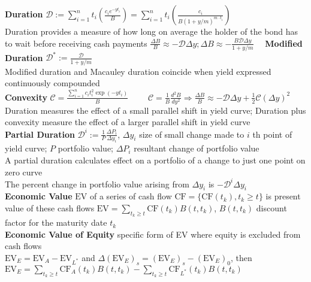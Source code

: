 \documentclass[12pt,landscape, a4paper]{article}
\theoremstyle{remark}
\newcommand{\EV}{\mathrm{EV}}
\newcommand{\CF}{\mathrm{CF}}
\begin{document}
\setlength{\abovedisplayskip}{0pt}%
\setlength{\belowdisplayskip}{0pt}%
\setlength{\abovedisplayshortskip}{0pt}%
\setlength{\belowdisplayshortskip}{0pt}%
\setlength{\jot}{0pt}%


\raggedright
\tiny
\begin{multicols*}{3}
\textbf{Duration} $\mathcal{D} := \sum^n_{i=1} t_i \left(\frac{c_i e^{-yt_i}}{B} \right) = \sum^n_{i=1} t_i \left(\frac{c_i}{B (1+y/m)^{m\cdot t_i} } \right)$\\
Duration provides a measure of how long on average the holder of the bond has to wait before receiving cash payments
$\frac{\Delta B}{B} \approx - \mathcal{D} \Delta y; \Delta B \approx - \frac{B \mathcal{D}\Delta y }{1+ y/m}\quad$
\textbf{Modified Duration} $\mathcal{D}^* := \frac{\mathcal{D}}{1 + y/m} $ \\
Modified duration and Macauley duration coincide when yield expressed continuously compounded\\

\textbf{Convexity} $\mathcal{C} = \frac{\sum^n_{i=1}c_i t^2_i \exp(-yt_i) }{B}\qquad$
$\mathcal{C} = \frac{1}{B} \frac{d^2 B}{dy^2} \Rightarrow \frac{\Delta B}{B} \approx -\mathcal{D} \Delta y + \frac{1}{2} \mathcal{C} (\Delta y)^2$\\
Duration measures the effect of a small parallel shift in yield curve; Duration plus convexity measure the effect of a larger parallel shift in yield curve\\

\textbf{Partial Duration} $\mathcal{D}^i := \frac{1}{P} \frac{\Delta P_i}{\Delta y_i}$, $\Delta y_i$ size of small change made to $i$ th point of yield curve; $P$ portfolio value; $\Delta P_i$ resultant change of portfolio value\\
A partial duration calculates effect on a portfolio of a change to just one point on zero curve\\
The percent change in portfolio value arising from $\Delta y_i$ is $-\mathcal{D}^i \Delta y_i$\\

\textbf{Economic Value} $\EV$ of a series of cash flow $\CF = \{\CF(t_k), t_k\geq t \}$ is present value of these cash flows $\EV = \sum_{t_k \geq t} \CF (t_k) B(t, t_k)$, $B(t, t_k)$ discount factor for the maturity date $t_k$\\
\textbf{Economic Value of Equity} specific form of EV where equity is excluded from cash flows\\
$\EV_E = \EV_A - \EV_{L^*}$ and $\Delta (\EV_E)_s = (\EV_E)_s - (\EV_E)_0$, then $\EV_E 
= \sum_{t_k \geq t} \CF_A (t_k) B(t, t_k) - \sum_{t_k \geq t} \CF_{L^*} (t_k) B(t, t_k)$\\


\end{multicols*}
\end{document}
